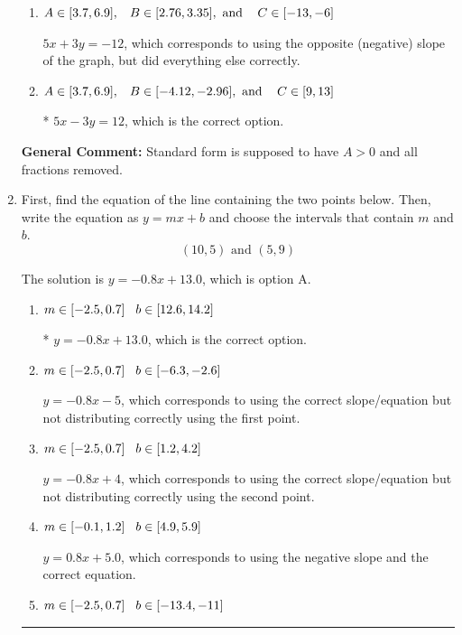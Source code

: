 \documentclass{extbook}[14pt]
\newcommand{\litem}[1]{\item #1

\rule{\textwidth}{0.4pt}}
\begin{document}
\begin{enumerate}
{\begin{enumerate}[label=\Alph*.]
 $-1.667x - 1y = 4.0$, which corresponds to using the opposite (negative) slope of the graph and not removing rational values.
\item \( A \in [3.7, 6.9], \hspace{3mm} B \in [2.76, 3.35], \text{ and } \hspace{3mm} C \in [-13, -6] \)

 $5x + 3y = -12$, which corresponds to using the opposite (negative) slope of the graph, but did everything else correctly.
\item \( A \in [3.7, 6.9], \hspace{3mm} B \in [-4.12, -2.96], \text{ and } \hspace{3mm} C \in [9, 13] \)

* $5x - 3y = 12$, which is the correct option.
\end{enumerate}

\textbf{General Comment:} Standard form is supposed to have $A > 0$ and all fractions removed.
}
\litem{
First, find the equation of the line containing the two points below. Then, write the equation as $ y=mx+b $ and choose the intervals that contain $m$ and $b$.
\[ (10, 5) \text{ and } (5, 9) \]

The solution is \( y = -0.8x + 13.0 \), which is option A.\begin{enumerate}[label=\Alph*.]
\item \( m \in [-2.5, 0.7] \hspace*{3mm} b \in [12.6, 14.2] \)

* $y = -0.8x + 13.0$, which is the correct option.
\item \( m \in [-2.5, 0.7] \hspace*{3mm} b \in [-6.3, -2.6] \)

 $y = -0.8x -5$, which corresponds to using the correct slope/equation but not distributing correctly using the first point.
\item \( m \in [-2.5, 0.7] \hspace*{3mm} b \in [1.2, 4.2] \)

 $y = -0.8x + 4$, which corresponds to using the correct slope/equation but not distributing correctly using the second point.
\item \( m \in [-0.1, 1.2] \hspace*{3mm} b \in [4.9, 5.9] \)

 $y = 0.8x + 5.0$, which corresponds to using the negative slope and the correct equation.
\item \( m \in [-2.5, 0.7] \hspace*{3mm} b \in [-13.4, -11] \)


\end{enumerate}}
\end{enumerate}
\end{document}
